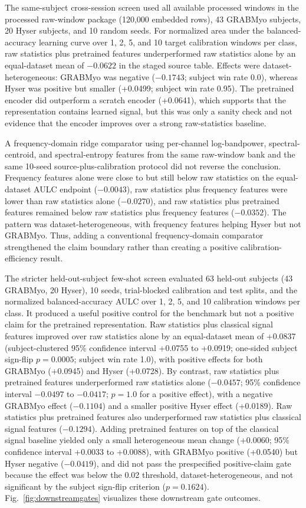 \documentclass[journal]{IEEEtran}
\begin{document}
The same-subject cross-session screen used all available processed windows in the processed raw-window package (120{,}000 embedded rows), 43 GRABMyo subjects, 20 Hyser subjects, and 10 random seeds. For normalized area under the balanced-accuracy learning curve over 1, 2, 5, and 10 target calibration windows per class, raw statistics plus pretrained features underperformed raw statistics alone by an equal-dataset mean of $-0.0622$ in the staged source table. Effects were dataset-heterogeneous: GRABMyo was negative ($-0.1743$; subject win rate 0.0), whereas Hyser was positive but smaller (+0.0499; subject win rate 0.95). The pretrained encoder did outperform a scratch encoder (+0.0641), which supports that the representation contains learned signal, but this was only a sanity check and not evidence that the encoder improves over a strong raw-statistics baseline.

A frequency-domain ridge comparator using per-channel log-bandpower, spectral-centroid, and spectral-entropy features from the same raw-window bank and the same 10-seed source-plus-calibration protocol did not reverse the conclusion. Frequency features alone were close to but still below raw statistics on the equal-dataset AULC endpoint ($-0.0043$), raw statistics plus frequency features were lower than raw statistics alone ($-0.0270$), and raw statistics plus pretrained features remained below raw statistics plus frequency features ($-0.0352$). The pattern was dataset-heterogeneous, with frequency features helping Hyser but not GRABMyo. Thus, adding a conventional frequency-domain comparator strengthened the claim boundary rather than creating a positive calibration-efficiency result.

The stricter held-out-subject few-shot screen evaluated 63 held-out subjects (43 GRABMyo, 20 Hyser), 10 seeds, trial-blocked calibration and test splits, and the normalized balanced-accuracy AULC over 1, 2, 5, and 10 calibration windows per class. It produced a useful positive control for the benchmark but not a positive claim for the pretrained representation. Raw statistics plus classical signal features improved over raw statistics alone by an equal-dataset mean of +0.0837 (subject-clustered 95\% confidence interval +0.0755 to +0.0919; one-sided subject sign-flip $p=0.0005$; subject win rate 1.0), with positive effects for both GRABMyo (+0.0945) and Hyser (+0.0728). By contrast, raw statistics plus pretrained features underperformed raw statistics alone ($-0.0457$; 95\% confidence interval $-0.0497$ to $-0.0417$; $p=1.0$ for a positive effect), with a negative GRABMyo effect ($-0.1104$) and a smaller positive Hyser effect (+0.0189). Raw statistics plus pretrained features also underperformed raw statistics plus classical signal features ($-0.1294$). Adding pretrained features on top of the classical signal baseline yielded only a small heterogeneous mean change (+0.0060; 95\% confidence interval +0.0033 to +0.0088), with GRABMyo positive (+0.0540) but Hyser negative ($-0.0419$), and did not pass the prespecified positive-claim gate because the effect was below the 0.02 threshold, dataset-heterogeneous, and not significant by the subject sign-flip criterion ($p=0.1624$). Fig.~\ref{fig:downstreamgates} visualizes these downstream gate outcomes.
\end{document}
